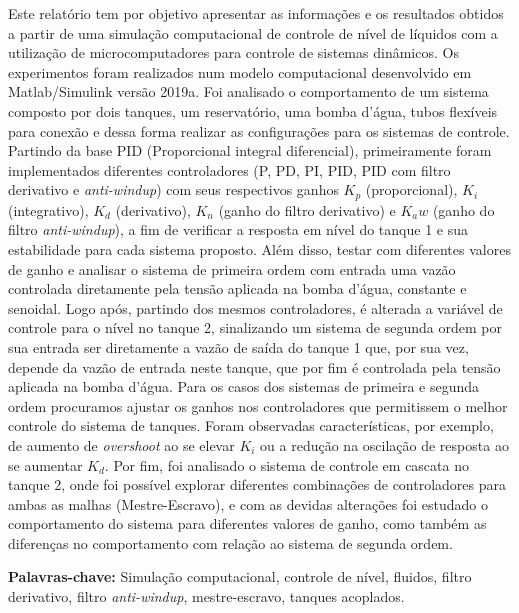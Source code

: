 \documentclass[a4paper,12pt]{article}
\begin{document}
\begin{flushleft}

 \hspace{4ex}Este relatório tem por objetivo apresentar as informações e os resultados obtidos a partir de uma simulação computacional de controle de nível de líquidos com a utilização de microcomputadores para controle de sistemas dinâmicos. Os experimentos foram realizados num modelo computacional desenvolvido em Matlab/Simulink versão 2019a. Foi analisado o comportamento de um sistema composto por dois tanques, um reservatório, uma bomba d’água, tubos flexíveis para conexão e dessa forma realizar as configurações para os sistemas de controle. Partindo da base PID (Proporcional integral diferencial), primeiramente foram implementados diferentes controladores (P, PD, PI, PID, PID com filtro derivativo e \emph{anti-windup}) com seus respectivos ganhos $K_p$ (proporcional), $K_i$ (integrativo), $K_d$ (derivativo), $K_n$ (ganho do filtro derivativo) e $K_aw$ (ganho do filtro \emph{anti-windup}),  a fim de verificar a resposta em nível do tanque 1 e sua estabilidade para cada sistema proposto. Além disso, testar com diferentes valores de ganho e analisar o sistema de primeira ordem com entrada uma vazão controlada diretamente pela tensão aplicada na bomba d'água, constante e senoidal. Logo após, partindo dos mesmos controladores, é alterada a variável de controle para o nível no tanque 2, sinalizando um sistema de segunda ordem por sua entrada ser diretamente a vazão de saída do tanque 1 que, por sua vez, depende da vazão de entrada neste tanque, que por fim é controlada pela tensão aplicada na bomba d'água. Para os casos dos sistemas de primeira e segunda ordem procuramos ajustar os ganhos nos controladores que permitissem o melhor controle do sistema de tanques. Foram observadas características, por exemplo, de aumento de \emph{overshoot} ao se elevar $K_i$ ou a redução na oscilação de resposta ao se aumentar $K_d$. Por fim, foi analisado o sistema de controle em cascata no tanque 2, onde foi possível explorar diferentes combinações de controladores para ambas as malhas (Mestre-Escravo), e com as devidas alterações foi estudado o comportamento do sistema para diferentes valores de ganho, como também as diferenças no comportamento com relação ao sistema de segunda ordem.

\end{flushleft}

\vspace{1cm}

\textbf{Palavras-chave:} Simulação computacional, controle de nível, fluidos, filtro derivativo, filtro \emph{anti-windup}, mestre-escravo, tanques acoplados.
\end{document}
